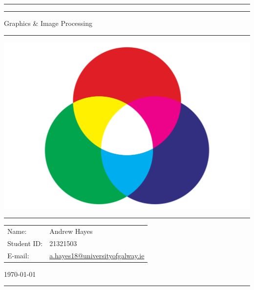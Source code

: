 \documentclass[a4paper,11pt]{article}
\author{Andrew Hayes}
\begin{document}
\begin{titlepage}
    \begin{center}
        \hrule
        \vspace*{0.6cm}
        \vspace*{0.6cm}
        \hrule
        \LARGE
        \vspace{0.5cm}
            Graphics \& Image Processing
        \vspace{0.5cm}
        \hrule

        \vfill
            \centering
            \includegraphics[width=\textwidth]{images/cover.png}
        \vfill

        \hrule
        \begin{minipage}{0.495\textwidth} 
            \vspace{0.4em}
            \raggedright
            \normalsize 
            \begin{tabular}{@{}l l}
                Name: & Andrew Hayes \\
                Student ID: & 21321503 \\
                E-mail: & \href{mailto://a.hayes18@universityofgalway.ie}{a.hayes18@universityofgalway.ie} \\
            \end{tabular}
        \end{minipage}
        \begin{minipage}{0.495\textwidth} 
            \raggedleft
            \vspace*{0.8cm}
            \Large
            \today
            \vspace*{0.6cm}
        \end{minipage}
        \medskip\hrule 
    \end{center}
\end{titlepage}
\end{document}
